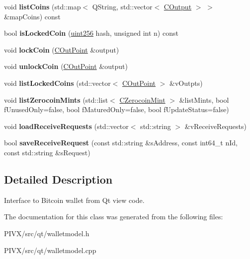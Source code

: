 \begin{DoxyCompactItemize}
void {\bfseries list\+Coins} (std\+::map$<$ Q\+String, std\+::vector$<$ \mbox{\hyperlink{class_c_output}{C\+Output}} $>$ $>$ \&map\+Coins) const
\item 
\mbox{\label{class_wallet_model_abeea7ae42ec38ace2786b2e3d340f5a2}} 
bool {\bfseries is\+Locked\+Coin} (\mbox{\hyperlink{classuint256}{uint256}} hash, unsigned int n) const
\item 
\mbox{\label{class_wallet_model_a9bb6c954dc3cf27e25ced65375fa02f0}} 
void {\bfseries lock\+Coin} (\mbox{\hyperlink{class_c_out_point}{C\+Out\+Point}} \&output)
\item 
\mbox{\label{class_wallet_model_a0a5514bd400327df0f7d63341d8fabf4}} 
void {\bfseries unlock\+Coin} (\mbox{\hyperlink{class_c_out_point}{C\+Out\+Point}} \&output)
\item 
\mbox{\label{class_wallet_model_a367977352d1ef183ec2cb6b508a85bc2}} 
void {\bfseries list\+Locked\+Coins} (std\+::vector$<$ \mbox{\hyperlink{class_c_out_point}{C\+Out\+Point}} $>$ \&v\+Outpts)
\item 
\mbox{\label{class_wallet_model_a901e0b3c32c39bd3301d90f05255f442}} 
void {\bfseries list\+Zerocoin\+Mints} (std\+::list$<$ \mbox{\hyperlink{class_c_zerocoin_mint}{C\+Zerocoin\+Mint}} $>$ \&list\+Mints, bool f\+Unused\+Only=false, bool f\+Matured\+Only=false, bool f\+Update\+Status=false)
\item 
\mbox{\label{class_wallet_model_a0ec10fbe74317b1949ac4ae63451d115}} 
void {\bfseries load\+Receive\+Requests} (std\+::vector$<$ std\+::string $>$ \&v\+Receive\+Requests)
\item 
\mbox{\label{class_wallet_model_a88d44bc0994c1701386f63b1f266637f}} 
bool {\bfseries save\+Receive\+Request} (const std\+::string \&s\+Address, const int64\+\_\+t n\+Id, const std\+::string \&s\+Request)
\end{DoxyCompactItemize}


\subsection{Detailed Description}
Interface to Bitcoin wallet from Qt view code. 

The documentation for this class was generated from the following files\+:\begin{DoxyCompactItemize}
\item 
P\+I\+V\+X/src/qt/walletmodel.\+h\item 
P\+I\+V\+X/src/qt/walletmodel.\+cpp\end{DoxyCompactItemize}
